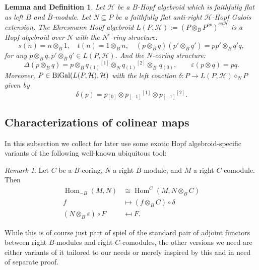 \documentclass[a4paper,reqno]{amsart}
\DeclareMathOperator{\Hom}{Hom}
\numberwithin{equation}{section}
\theoremstyle{plain}
\newtheorem{LD}[thm]{Lemma and Definition}
\theoremstyle{remark}
\newtheorem{rem}[thm]{Remark}
\numberwithin{equation}{section}
\newcommand{\ot}{\otimes}
\newcommand\ol{\overline}
\newcommand{\Bi}{\textup{BiGal}}
\newcommand{\BB}{\overline{B}}
\newcommand{\yi}[1]{{#1}{}{}^{\scriptscriptstyle{[1]}}}
\newcommand{\er}[1]{{#1}{}{}^{\scriptscriptstyle{[2]}}}
\newcommand{\z}{{}_{\scriptscriptstyle{(0)}}}
\newcommand{\rz}{{}_{\scriptscriptstyle{[0]}}}
\renewcommand{\o}{{}_{\scriptscriptstyle{(1)}}}
\newcommand{\rmo}{{}_{\scriptscriptstyle{[-1]}}}
\newcommand\ou[1]{\otimes_{#1}}
\newcommand{\CH}{\mathcal{H}}
\begin{document}
\begin{LD}\label{lem. bigalois given by ehresmann groupoid} 
     Let $\CH$ be a  $B$-Hopf algebroid which is faithfully flat as left $B$ and $\ol B$-module. Let $N\subseteq P$ be a faithfully flat anti-right $\CH$-Hopf Galois extension. The  Ehresmann Hopf algebroid $L(P,\CH):=(P\ot_{\BB}P^{op})^{co\CH}$ is a Hopf algebroid over $N$ with the $N^e$-ring structure:
     \[s(n)=n\ot_{\overline{B}}1,\quad t(n)=1\ot_{\overline{B}}n,\quad (p\ot_{\overline{B}}q)(p'\ot_{\overline{B}}q')=pp'\ot_{\overline{B}}q'q,\]
    for any $p\ot_{\BB}q, p'\ot_{\BB}q'\in L(P, \CH)$.
    And the $N$-coring structure:
    \[\Delta(p\ot_{\BB} q)=p\ot_{\BB}\yi{q\o}\ot_{N}\er{q\o}\ot_{\BB}\,q\z,\qquad \varepsilon(p\ot q)=pq.\]
   Moreover, $P\in\Bi(L(P,\CH),\CH)$ with the left coaction $\delta:P\to L(P, \CH)\diamond_{N}P$ given by
    \[\delta(p)=p\rz\ot p\rmo\yi{}\ot p\rmo\er{}.\]  
\end{LD}


\subsection{Characterizations of colinear maps}\label{skewedbijections}
In this subsection we collect for later use some exotic Hopf algebroid-specific variants of the following well-known ubiquitous tool:
\begin{rem}\label{free comodule bijection}
    Let $C$ be a $B$-coring, $N$ a right $B$-module, and $M$ a right $C$-comodule. Then 
    \begin{align*}
        \Hom_{-B}(M,N)&\cong \Hom^C(M,N\ou BC)\\
        f&\mapsto (f\ou BC)\circ\delta\\
        (N\ou B\varepsilon)\circ F&\mapsfrom F.
    \end{align*}
\end{rem}
While this is of course just part of spiel of the standard pair of adjoint functors between right $B$-modules and right $C$-comodules, the other versions we need are either variants of it tailored to our needs or merely inspired by this and in need of separate proof.
\end{document}

